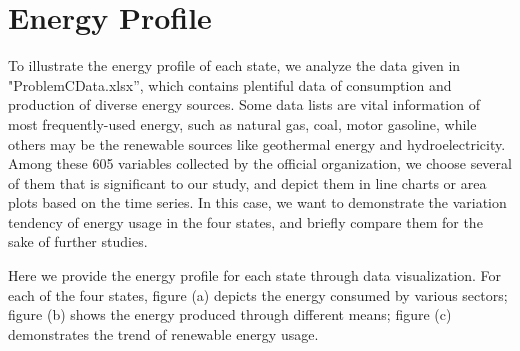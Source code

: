 \documentclass{mcmthesis}
\begin{document}
\section{Energy Profile}
To illustrate the energy profile of each state, we analyze the data given in "ProblemCData.xlsx”, which contains plentiful data of consumption and production of diverse energy sources.
Some data lists are vital information of most frequently-used energy, such as natural gas, coal, motor gasoline, while others may be the renewable sources like geothermal energy and hydroelectricity.
Among these 605 variables collected by the official organization, we choose several of them that is significant to our study, and depict them in line charts or area plots based on the time series.
In this case, we want to demonstrate the variation tendency of energy usage in the four states, and briefly compare them for the sake of further studies.

Here we provide the energy profile for each state through data visualization.
For each of the four states, figure (a) depicts the energy consumed by various sectors; figure (b) shows the energy produced through different means; figure (c) demonstrates the trend of renewable energy usage.
\end{document}
